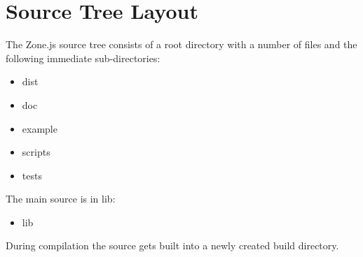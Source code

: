 \section{Source Tree Layout}

The Zone.js source tree consists of a root directory with a number of files and the
following immediate sub-directories:

\begin{itemize}
  \item dist
  \item doc
  \item example
  \item scripts
  \item tests
\end{itemize}

The main source is in lib:

\begin{itemize}
  \item lib
\end{itemize}

During compilation the source gets built into a newly created build directory.





